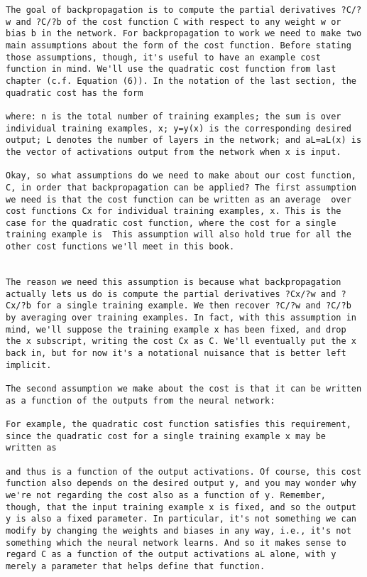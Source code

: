 \begin{lstlisting}
The goal of backpropagation is to compute the partial derivatives ?C/?w and ?C/?b of the cost function C with respect to any weight w or bias b in the network. For backpropagation to work we need to make two main assumptions about the form of the cost function. Before stating those assumptions, though, it's useful to have an example cost function in mind. We'll use the quadratic cost function from last chapter (c.f. Equation (6)). In the notation of the last section, the quadratic cost has the form 

where: n is the total number of training examples; the sum is over individual training examples, x; y=y(x) is the corresponding desired output; L denotes the number of layers in the network; and aL=aL(x) is the vector of activations output from the network when x is input.

Okay, so what assumptions do we need to make about our cost function, C, in order that backpropagation can be applied? The first assumption we need is that the cost function can be written as an average  over cost functions Cx for individual training examples, x. This is the case for the quadratic cost function, where the cost for a single training example is  This assumption will also hold true for all the other cost functions we'll meet in this book.


The reason we need this assumption is because what backpropagation actually lets us do is compute the partial derivatives ?Cx/?w and ?Cx/?b for a single training example. We then recover ?C/?w and ?C/?b by averaging over training examples. In fact, with this assumption in mind, we'll suppose the training example x has been fixed, and drop the x subscript, writing the cost Cx as C. We'll eventually put the x back in, but for now it's a notational nuisance that is better left implicit.

The second assumption we make about the cost is that it can be written as a function of the outputs from the neural network: 

For example, the quadratic cost function satisfies this requirement, since the quadratic cost for a single training example x may be written as 

and thus is a function of the output activations. Of course, this cost function also depends on the desired output y, and you may wonder why we're not regarding the cost also as a function of y. Remember, though, that the input training example x is fixed, and so the output y is also a fixed parameter. In particular, it's not something we can modify by changing the weights and biases in any way, i.e., it's not something which the neural network learns. And so it makes sense to regard C as a function of the output activations aL alone, with y merely a parameter that helps define that function.


\end{lstlisting}
